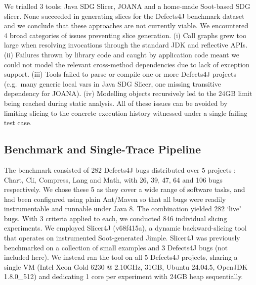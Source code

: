 \documentclass[sigconf,nonacm]{acmart}
\begin{document}
We trialled 3 tools: Java SDG Slicer, JOANA and a home-made Soot-based SDG slicer. None succeeded in generating slices for the Defects4J benchmark dataset and we conclude that these approaches are not currently viable. We encountered 4 broad categories of issues preventing slice generation. (i) Call graphs grew too large when resolving invocations through the standard JDK and reflective APIs. (ii) Failures thrown by library code and caught by application code meant we could not model the relevant cross-method dependencies due to lack of exception support. (iii) Tools failed to parse or compile one or more Defects4J projects (e.g.\ many generic local vars in Java SDG Slicer, one missing transitive dependency for JOANA). (iv) Modelling objects recursively led to the 24GB limit being reached during static analysis. All of these issues can be avoided by limiting slicing to the concrete execution history witnessed under a single failing test case.

\subsection{Benchmark and Single-Trace Pipeline}

The benchmark consisted of 282 Defects4J bugs distributed over 5 projects \cite{Just2014Defects4J}: Chart, Cli, Compress, Lang and Math, with 26, 39, 47, 64 and 106 bugs respectively. We chose these 5 as they cover a wide range of software tasks, and had been configured using plain Ant/Maven so that all bugs were readily instrumentable and runnable under Java 8. The combination yielded 282 `live' bugs. With 3 criteria applied to each, we conducted 846 individual slicing experiments. We employed Slicer4J (v68f415a), a dynamic backward-slicing tool that operates on instrumented Soot-generated Jimple. Slicer4J was previously benchmarked on a collection of small examples and 3 Defects4J bugs (not included here). We instead ran the tool on all 5 Defects4J projects, sharing a single VM (Intel Xeon Gold 6230 @ 2.10GHz, 31GB, Ubuntu 24.04.5, OpenJDK 1.8.0\_512) and dedicating 1 core per experiment with 24GB heap sequentially.
\end{document}

